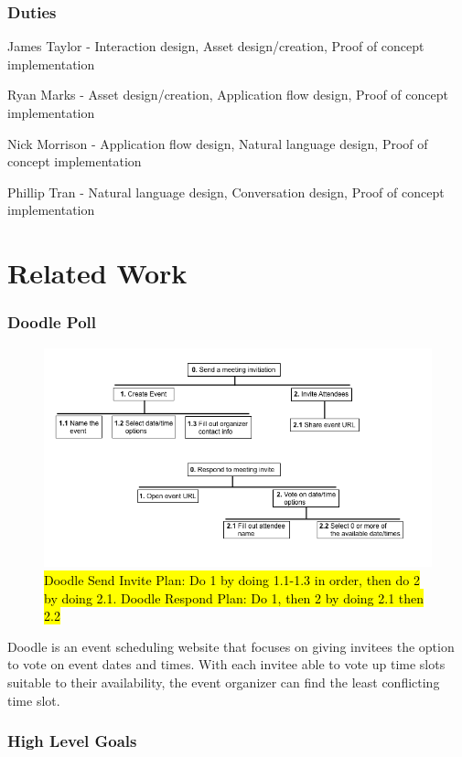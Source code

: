 \documentclass{sigchi}
\begin{document}
\subsubsection{Duties}

James Taylor - Interaction design, Asset design/creation, Proof of concept implementation

Ryan Marks - Asset design/creation, Application flow design, Proof of concept implementation

Nick Morrison - Application flow design, Natural language design, Proof of concept implementation

Phillip Tran - Natural language design, Conversation design, Proof of concept implementation


\section{Related Work}

\subsubsection{Doodle Poll}
\FloatBarrier
\begin{figure}
  \centering
  \includegraphics[width=1.75\columnwidth]{doodle/hta}
  \caption{\hl{Doodle Send Invite Plan: Do 1 by doing 1.1-1.3 in order, then do 2 by doing 2.1. Doodle Respond Plan: Do 1, then 2 by doing 2.1 then 2.2}}
\end{figure}

Doodle is an event scheduling website that focuses on giving invitees the option to vote on event dates and times. With each invitee able to vote up time slots suitable to their availability, the event organizer can find the least conflicting time slot.

\subsubsection{High Level Goals}
\end{document}
